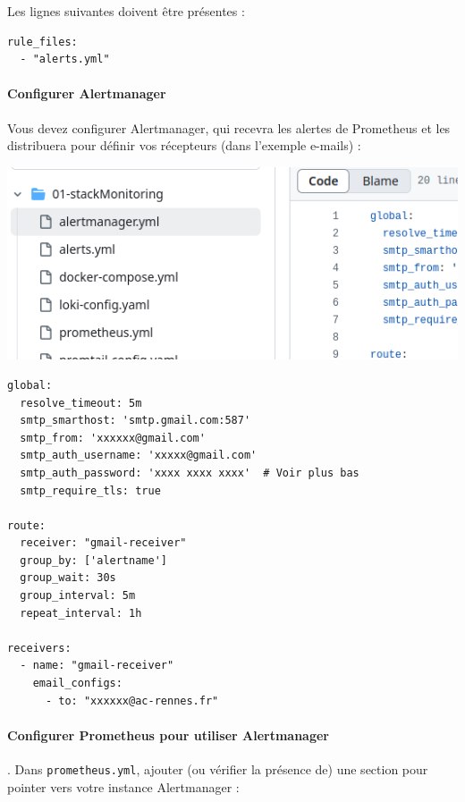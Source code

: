 \documentclass[french, 12pt]{article}%
\begin{document}
Les lignes suivantes doivent être présentes : 
\begin{lstlisting}[style=commande]  
rule_files:
  - "alerts.yml"
\end{lstlisting}

\paragraph{Configurer Alertmanager}
Vous devez configurer Alertmanager, qui recevra les alertes de Prometheus et les distribuera pour définir vos récepteurs (dans l'exemple e-mails) :


\begin{center}
\includegraphics[scale=0.4]{./ressource/alertmanager}
\end{center}

\begin{lstlisting}[style=commande]  
global:
  resolve_timeout: 5m
  smtp_smarthost: 'smtp.gmail.com:587'
  smtp_from: 'xxxxxx@gmail.com'
  smtp_auth_username: 'xxxxx@gmail.com'
  smtp_auth_password: 'xxxx xxxx xxxx'  # Voir plus bas
  smtp_require_tls: true

route:
  receiver: "gmail-receiver"
  group_by: ['alertname']
  group_wait: 30s
  group_interval: 5m
  repeat_interval: 1h

receivers:
  - name: "gmail-receiver"
    email_configs:
      - to: "xxxxxx@ac-rennes.fr"
\end{lstlisting}


\paragraph{Configurer Prometheus pour utiliser Alertmanager}. Dans \verb?prometheus.yml?, ajouter (ou vérifier la présence de) une section pour pointer vers votre instance Alertmanager :
\end{document}
